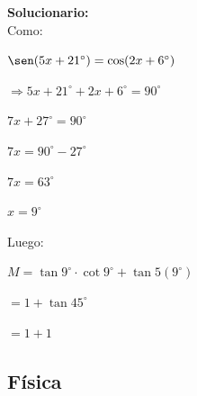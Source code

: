 \begin{enumerate}
	\vspace{2mm}
	\textbf{Solucionario:}\\
	Como:
	
	$\sen(5x+21^\circ)=\cos(2x+6^\circ)$
	
	$\Rightarrow 5x+21^\circ+2x+6^\circ=90^\circ$
	
	$7x+27^\circ=90^\circ$
	
	$7x=90^\circ-27^\circ$
	
	$7x=63^\circ$
	
	$x=9^\circ$
	
	Luego:
	
	$M=\tan 9^\circ\cdot \cot 9^\circ+\tan 5(9^\circ)$
	
	$=1+\tan 45^\circ$
	
	$=1+1$
	
	
	\vspace{6mm}
\end{enumerate}

\subsection*{Física}

